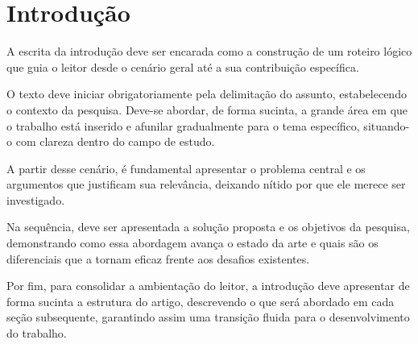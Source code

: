 
\section{Introdução}
\label{sec:introducao}


A escrita da introdução deve ser encarada como a construção de um roteiro lógico 
que guia o leitor desde o cenário geral até a sua contribuição específica. 

O texto deve iniciar obrigatoriamente pela delimitação do assunto, 
estabelecendo o contexto da pesquisa. Deve-se abordar, de forma sucinta, 
a grande área em que o trabalho está inserido e afunilar gradualmente para 
o tema específico, situando-o com clareza dentro do campo de estudo.

A partir desse cenário, é fundamental apresentar o problema central e os argumentos 
que justificam sua relevância, deixando nítido por que ele merece ser investigado. 

Na sequência, deve ser apresentada a solução proposta e os objetivos da pesquisa, 
demonstrando como essa abordagem avança o estado da arte e quais são 
os diferenciais que a tornam eficaz frente aos desafios existentes. 

Por fim, para consolidar a ambientação do leitor, a introdução deve apresentar 
de forma sucinta a estrutura do artigo, descrevendo o que será abordado em 
cada seção subsequente, garantindo assim uma transição fluida para o 
desenvolvimento do trabalho.

